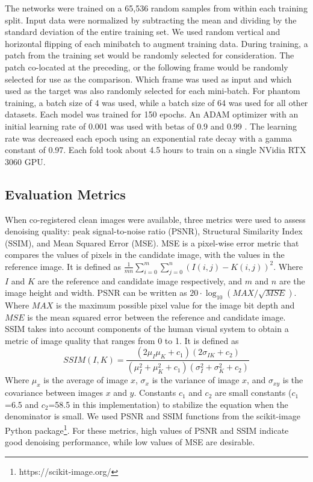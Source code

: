 \documentclass[12pt]{spieman}
\begin{document}
\begin{spacing}{2}
The networks were trained on a 65,536 random samples from within each training split. Input data were normalized by subtracting the mean and dividing by the standard deviation of the entire training set. We used random vertical and horizontal flipping of each minibatch to augment training data. During training, a patch from the training set would be randomly selected for consideration. The patch co-located at the preceding, or the following frame would be randomly selected for use as the comparison. Which frame was used as input and which used as the target was also randomly selected for each mini-batch. For phantom training, a batch size of 4 was used, while a batch size of 64 was used for all other datasets. Each model was trained for 150 epochs. An ADAM optimizer with an initial learning rate of 0.001 was used with betas of 0.9 and 0.99 \cite{Kingma2015}. The learning rate was decreased each epoch using an exponential rate decay with a gamma constant of 0.97. Each fold took about 4.5 hours to train on a single NVidia RTX 3060 GPU.

\subsection{Evaluation Metrics}
When co-registered clean images were available, three metrics were used to assess denoising quality: peak signal-to-noise ratio (PSNR), Structural Similarity Index (SSIM)\cite{Wang2002}, and Mean Squared Error (MSE). MSE is a pixel-wise error metric that compares the values of pixels in the candidate image, with the values in the reference image. It is defined as $\frac{1}{mn} \sum_{i=0}^m\sum_{j=0}^n(I(i,j) - K(i,j))^2$. Where $I$ and $K$ are the reference and candidate image respectively, and $m$ and $n$ are the image height and width. PSNR can be written as $20\cdot\log_{10}(MAX/\sqrt{MSE})$. Where $MAX$ is the maximum possible pixel value for the image bit depth and $MSE$ is the mean squared error between the reference and candidate image. SSIM takes into account components of the human visual system to obtain a metric of image quality that ranges from 0 to 1. It is defined as
\begin{equation}
	SSIM(I,K) = \frac{(2\mu_I\mu_K + c_1)(2\sigma_{IK}+c_2)}{(\mu_I^2 + \mu_K^2 + c_1)(\sigma_I^2 + \sigma_K^2 + c_2)}
\end{equation}
Where $\mu_x$ is the average of image $x$, $\sigma_x$ is the variance of image $x$, and $\sigma_{xy}$ is the covariance between images $x$ and $y$. Constants $c_1$ and $c_2$ are small constants ($c_1$=6.5 and $c_2$=58.5 in this implementation) to stabilize the equation when the denominator is small. We used PSNR and SSIM functions from the scikit-image Python package\footnote{https://scikit-image.org/}. For these metrics, high values of PSNR and SSIM indicate good denoising performance, while low values of MSE are desirable. 


\end{spacing}
\end{document}
